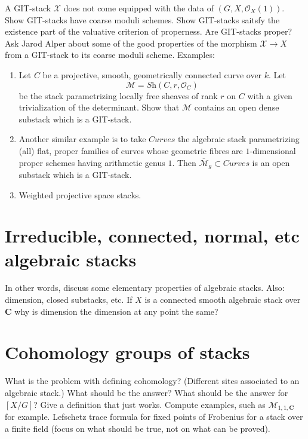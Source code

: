 \documentclass{amsart}
\theoremstyle{plain}
\theoremstyle{definition}
\theoremstyle{remark}
\numberwithin{equation}{subsection}
\begin{document}
\noindent
A GIT-stack $\mathcal{X}$ does not come equipped with the data
of $(G, X, \mathcal{O}_X(1))$. Show GIT-stacks have coarse moduli
schemes. Show GIT-stacks saitsfy the existence part of the valuative
criterion of properness. Are GIT-stacks proper?
Ask Jarod Alper about some of the good properties of the
morphism $\mathcal{X} \to X$ from a GIT-stack to its coarse
moduli scheme. Examples:
\begin{enumerate}
\item Let $C$ be a projective, smooth,
geometrically connected curve over $k$. Let
$$
\mathcal{M} = \textit{Sh}(C, r, \mathcal{O}_C)
$$
be the stack parametrizing locally free sheaves of rank $r$ on
$C$ with a given trivialization of the determinant. Show that
$\mathcal{M}$ contains an open dense substack which is a GIT-stack.
\item Another similar example is to take $\textit{Curves}$ the algebraic
stack parametrizing (all) flat, proper families of curves
whose geometric fibres are $1$-dimensional proper schemes
having arithmetic genus $1$. Then
$\overline{\mathcal{M}}_g \subset \textit{Curves}$ is an
open substack which is a GIT-stack.
\item Weighted projective space stacks.
\end{enumerate}


\section{Irreducible, connected, normal, etc algebraic stacks}
\label{section-elementary-properties}

\noindent
In other words, discuss some elementary properties of algebraic stacks.
Also: dimension, closed substacks, etc.
If $X$ is a connected smooth algebraic stack over $\mathbf{C}$
why is dimension the dimension at any point the same?


\section{Cohomology groups of stacks}
\label{section-cohomology}

\noindent
What is the problem with defining cohomology? (Different sites
associated to an algebraic stack.)
What should be the answer? What should be the answer for $[X/G]$?
Give a definition that just works.
Compute examples, such as $\mathcal{M}_{1, 1, \mathbf{C}}$ for example.
Lefschetz trace formula for fixed points of Frobenius
for a stack over a finite field (focus on what should be true, not on
what can be proved).
\end{document}
